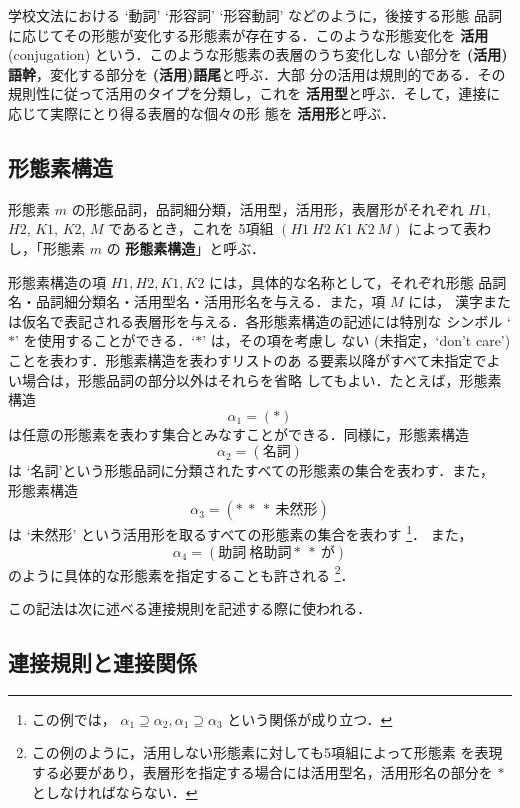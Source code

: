 \documentclass[a4j,titlepage]{jarticle}
\begin{document}
学校文法における `動詞' `形容詞' `形容動詞' などのように，後接する形態
品詞に応じてその形態が変化する形態素が存在する．このような形態変化を 
{\bf 活用} (conjugation) という．このような形態素の表層のうち変化しな
い部分を {\bf (活用)語幹}，変化する部分を {\bf (活用)語尾}と呼ぶ．大部
分の活用は規則的である．その規則性に従って活用のタイプを分類し，これを 
{\bf 活用型}と呼ぶ．そして，連接に応じて実際にとり得る表層的な個々の形
態を {\bf 活用形}と呼ぶ．

\subsection{形態素構造}
\label{ss:jmg-ms}

形態素 $m$ の形態品詞，品詞細分類，活用型，活用形，表層形がそれぞれ 
$H1$, $H2$, $K1$, $K2$, $M$ であるとき，これを 5項組 $(H1\ H2\ K1\ K2\
M)$ によって表わし，「形態素 $m$ の {\bf 形態素構造}」と呼ぶ．

形態素構造の項 $H1, H2, K1, K2$ には，具体的な名称として，それぞれ形態
品詞名・品詞細分類名・活用型名・活用形名を与える．また，項 $M$ には，
漢字または仮名で表記される表層形を与える．各形態素構造の記述には特別な
シンボル `$\ast$' を使用することができる．`$\ast$' は，その項を考慮し
ない (未指定，`don't care') ことを表わす．形態素構造を表わすリストのあ
る要素以降がすべて未指定でよい場合は，形態品詞の部分以外はそれらを省略
してもよい．たとえば，形態素構造
\[ \alpha_{1} = (\ast) \]
は任意の形態素を表わす集合とみなすことができる．同様に，形態素構造
\[ \alpha_{2} = (\mbox{名詞}) \]
は `名詞'という形態品詞に分類されたすべての形態素の集合を表わす．また，
形態素構造
\[ \alpha_{3} = (\ast\ \ast\ \ast\ \mbox{未然形}) \]
は `未然形' という活用形を取るすべての形態素の集合を表わす
\footnote{
この例では，
\(\alpha_{1} \supseteq \alpha_{2}, \alpha_{1} \supseteq \alpha_{3}\)
という関係が成り立つ．
}．
また，
\[ \alpha_{4} = ( \mbox{助詞} \ \mbox{格助詞} \ast\ \ast\ \mbox{が} ) \]
のように具体的な形態素を指定することも許される
\footnote{この例のように，活用しない形態素に対しても5項組によって形態素
を表現する必要があり，表層形を指定する場合には活用型名，活用形名の部分を
$\ast$としなければならない．}．

この記法は次に述べる連接規則を記述する際に使われる．

\subsection{連接規則と連接関係}
\label{ss:jmg-c}
\end{document}
